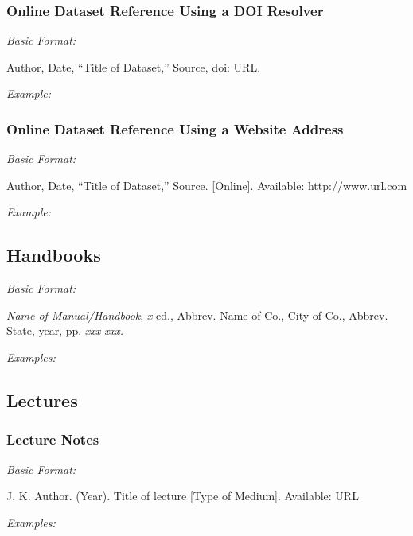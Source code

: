 \documentclass[10pt]{article}
\newcommand*{\guidelabel}[1]{\par\vspace{-4pt}\hspace*{22pt}\textit{#1}\par\vspace{-\parskip}}
\begin{document}
\subsubsection{Online Dataset Reference Using a DOI Resolver}
\guidelabel{Basic Format:}
\begin{guideitems}
  \item Author, Date, “Title of Dataset,” Source, doi: URL.
\end{guideitems}
\guidelabel{Example:}
\begin{guideitems}
  \item {}
\end{guideitems}

\subsubsection{Online Dataset Reference Using a Website Address}
\guidelabel{Basic Format:}
\begin{guideitems}
  \item Author, Date, “Title of Dataset,” Source. [Online]. Available: http://www.url.com
\end{guideitems}
\guidelabel{Example:}
\begin{guideitems}
  \item {}
\end{guideitems}

\subsection{Handbooks}
\guidelabel{Basic Format:}
\begin{guideitems}
  \item \textit{Name of Manual/Handbook}, \textit{x} ed., Abbrev. Name of Co., City of Co., Abbrev. State, year, pp. \textit{xxx-xxx.}
\end{guideitems}
\guidelabel{Examples:}
\begin{guideitems}
  \item {}
  \item {}
  \item {}
\end{guideitems}

\subsection{Lectures}

\subsubsection{Lecture Notes}
\guidelabel{Basic Format:}
\begin{guideitems}
  \item J. K. Author. (Year). Title of lecture [Type of Medium]. Available: URL
\end{guideitems}
\guidelabel{Examples:}
\begin{guideitems}
  \item {}
  \item {}
\end{guideitems}
\end{document}
